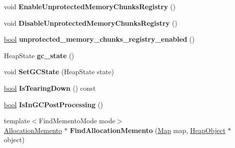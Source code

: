 \begin{DoxyCompactItemize}
\item 
\mbox{\label{classv8_1_1internal_1_1Heap_a7c176334eda64c6b036217a18493bd8b}} 
void {\bfseries Enable\+Unprotected\+Memory\+Chunks\+Registry} ()
\item 
\mbox{\label{classv8_1_1internal_1_1Heap_ae7790a58aee6abe461cf07f947c8f9b3}} 
void {\bfseries Disable\+Unprotected\+Memory\+Chunks\+Registry} ()
\item 
\mbox{\label{classv8_1_1internal_1_1Heap_ada769c083e5cfdacabad3cfdca5c42d7}} 
\mbox{\hyperlink{classbool}{bool}} {\bfseries unprotected\+\_\+memory\+\_\+chunks\+\_\+registry\+\_\+enabled} ()
\item 
\mbox{\label{classv8_1_1internal_1_1Heap_a0d9f57dc1f21bd86c17a7abf1766ccd4}} 
Heap\+State {\bfseries gc\+\_\+state} ()
\item 
\mbox{\label{classv8_1_1internal_1_1Heap_a47a3ef0aa46fbbf7000f6e7e6db5fc26}} 
void {\bfseries Set\+G\+C\+State} (Heap\+State state)
\item 
\mbox{\label{classv8_1_1internal_1_1Heap_a22dabf94de324c0eb88a91d74839f4ec}} 
\mbox{\hyperlink{classbool}{bool}} {\bfseries Is\+Tearing\+Down} () const
\item 
\mbox{\label{classv8_1_1internal_1_1Heap_aa6bdb0010eb8a30010560de3fe7e18f8}} 
\mbox{\hyperlink{classbool}{bool}} {\bfseries Is\+In\+G\+C\+Post\+Processing} ()
\item 
\mbox{\label{classv8_1_1internal_1_1Heap_a0c7d8764b856b66c8b3dfddb644bba75}} 
{\footnotesize template$<$Find\+Memento\+Mode mode$>$ }\\\mbox{\hyperlink{classv8_1_1internal_1_1AllocationMemento}{Allocation\+Memento}} $\ast$ {\bfseries Find\+Allocation\+Memento} (\mbox{\hyperlink{classv8_1_1internal_1_1Map}{Map}} map, \mbox{\hyperlink{classv8_1_1internal_1_1HeapObject}{Heap\+Object}} $\ast$object)
\item 
\mbox{\label{classv8_1_1internal_1_1Heap_a670c37a7397676b40df58d3bcf65fa0a}} 

\end{DoxyCompactItemize}
